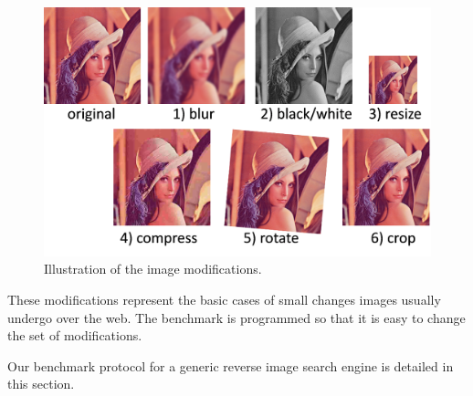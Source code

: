 \begin{figure}
	\centering
	\includegraphics[width=\textwidth]{img/modifications.png}
	\caption{Illustration of the image modifications.}
	\label{fig:protocol_modifications}
\end{figure}

These modifications represent the basic cases of small changes images usually undergo over the web. The benchmark is programmed so that it is easy to change the set of modifications.

Our benchmark protocol for a generic reverse image search engine is detailed in this section. 

